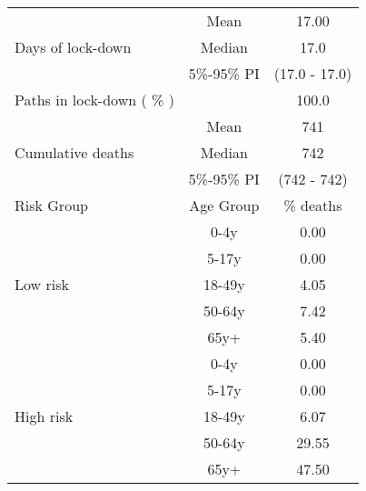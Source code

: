 \documentclass{article}
\begin{document}
\begin{table}[th]
\centering
\begin{tabular}{p{4cm}cc}
\toprule
\multirow{3}{*}{Days   of lock-down} & Mean      & 17.00                        \\ \cmidrule(l){2-3} 
                                     & Median    & 17.0                      \\ \cmidrule(l){2-3} 
                                     & 5\%-95\% PI & (17.0 - 17.0)       \\ \midrule 
\multirow{1}{*}{Paths in lock-down ( \% )} &      &         100.0              \\   \midrule                     
\multirow{3}{\hsize}{Cumulative deaths}       & Mean      & 741 \\ \cmidrule(l){2-3} 
                                     & Median    & 742                        \\ \cmidrule(l){2-3} 
                                     & 5\%-95\% PI & (742 - 742)           \\  \midrule
Risk Group                           & Age Group & \multicolumn{1}{c}{\% deaths}        \\  \midrule
\multirow{5}{*}{Low   risk}          & 0-4y      & 0.00                         \\ \cmidrule(l){2-3} 
                                     & 5-17y     & 0.00                         \\ \cmidrule(l){2-3} 
                                     & 18-49y    & 4.05                         \\ \cmidrule(l){2-3} 
                                     & 50-64y    & 7.42                         \\ \cmidrule(l){2-3} 
                                     & 65y+      & 5.40                         \\ \midrule
\multirow{5}{*}{High   risk}         & 0-4y      & 0.00                         \\ \cmidrule(l){2-3} 
                                     & 5-17y     & 0.00                         \\ \cmidrule(l){2-3} 
                                     & 18-49y    & 6.07                         \\ \cmidrule(l){2-3} 
                                     & 50-64y    & 29.55                         \\ \cmidrule(l){2-3} 
                                     & 65y+      & 47.50                         \\ \midrule

\end{tabular}
\end{table}
\end{document}
